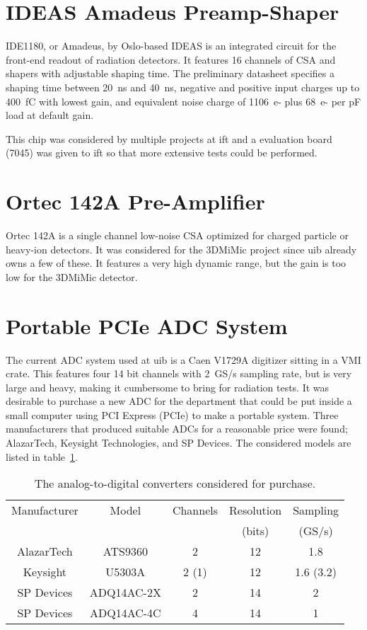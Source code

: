 \documentclass[../main/thesis.tex]{subfiles}
\begin{document}
\section{IDEAS Amadeus Preamp-Shaper}
\label{e-ide1180}
IDE1180, or Amadeus, by Oslo-based IDEAS is an integrated circuit for the front-end readout of radiation detectors. It features 16 channels of \gls{CSA} and shapers with adjustable shaping time. The preliminary datasheet \citep{IDE1180} specifies a shaping time between 20~ns and 40~ns, negative and positive input charges up to 400~fC with lowest gain, and equivalent noise charge of 1106~e- plus 68~e- per pF load at default gain. 

This chip was considered by multiple projects at \gls{ift} and a evaluation board (7045) was given to \gls{ift} so that more extensive tests could be performed. 

\section{Ortec 142A Pre-Amplifier}
\label{e-ortec}
Ortec 142A is a single channel low-noise \gls{CSA} optimized for charged particle or heavy-ion detectors. It was considered for the 3DMiMic project since \gls{uib} already owns a few of these. It features a very high dynamic range, but the gain is too low for the 3DMiMic detector. 

\section{Portable PCIe ADC System}
\label{e-adc}
The current \gls{ADC} system used at \gls{uib} is a Caen V1729A digitizer sitting in a VMI crate. This features four 14 bit channels with 2~GS/s sampling rate, but is very large and heavy, making it cumbersome to bring for radiation tests. It was desirable to purchase a new \gls{ADC} for the department that could be put inside a small computer using PCI Express (PCIe) to make a portable system. Three manufacturers that produced suitable \gls{ADC}s for a reasonable price were found; AlazarTech, Keysight Technologies, and SP Devices. The considered models are listed in table~\ref{tab-adc}. 

\begin{table}[h]
\begin{center}
	\caption{The analog-to-digital converters considered for purchase.}
	\label{tab-adc}
	\begin{tabular}{| c | c | c | c | c |}
		\hline
		Manufacturer & Model & Channels & Resolution & Sampling \\ 
		 & & & (bits) & (GS/s) \\ \hline
		AlazarTech & ATS9360 & 2 & 12 & 1.8 \\ \hline
		Keysight & U5303A & 2 (1) & 12 & 1.6 (3.2) \\ \hline
		SP Devices & ADQ14AC-2X & 2 & 14 & 2 \\ \hline
		SP Devices & ADQ14AC-4C & 4 & 14 & 1 \\ \hline
	\end{tabular}
\end{center}
\end{table}
\end{document}
